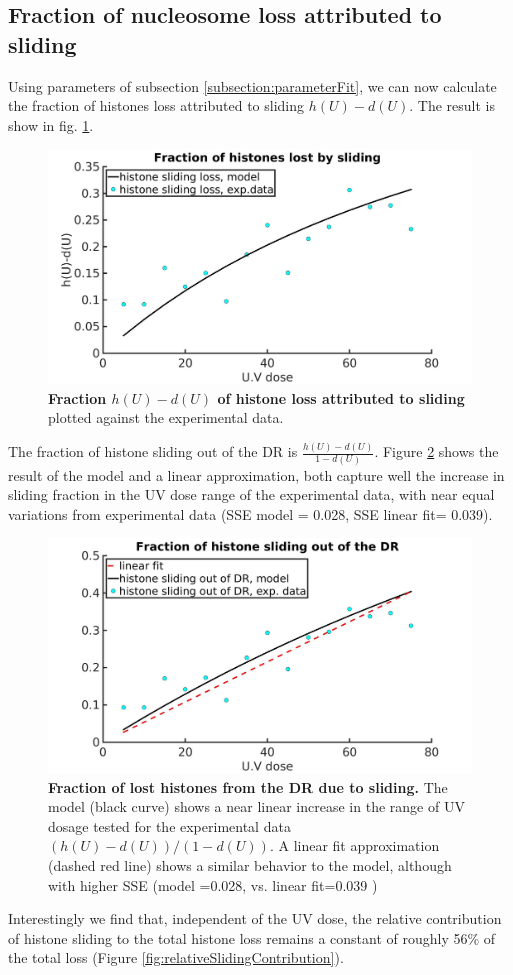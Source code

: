 \documentclass[12pt]{article}
\begin{document}
\subsection{Fraction of nucleosome loss attributed to sliding}\label{subsection:lossAttributedToSliding}
Using parameters of subsection \ref{subsection:parameterFit}, we can now calculate the fraction of histones loss attributed to sliding $h(U)-d(U)$. The result is show in fig. \ref{fig:hVsUVDoseModelFit01}.
\begin{figure}[http!]
\centering
\includegraphics[width=0.5\linewidth, height=0.3\textheight]{hVsUVDoseModelFit01}
\caption{\textbf{Fraction $h(U)-d(U)$ of histone loss attributed to sliding} plotted against the experimental data.}
\label{fig:hVsUVDoseModelFit01}
\end{figure}
The fraction of histone sliding out of the DR is $\frac{h(U)-d(U)}{1-d(U)}$. Figure \ref{fig:histoneSlideFromDamageRegionComparision} shows the result of the model and a linear approximation, both capture well the increase in sliding fraction in the UV dose range of the experimental data, with near equal variations from experimental data (SSE model = 0.028, SSE linear fit= 0.039).
\begin{figure}[http!]
	\centering
	\includegraphics[width=0.7\linewidth, height=0.3\textheight]{histoneSlideFromDamageRegionComparision}
	\caption{\textbf{Fraction of lost histones from the DR due to sliding.} The model (black curve) shows a near linear increase in the range of UV dosage tested for the experimental data $(h(U)-d(U))/(1-d(U))$. A linear fit approximation (dashed red line) shows a similar behavior to the model, although with higher SSE (model =0.028, vs. linear fit=0.039 ) }
	\label{fig:histoneSlideFromDamageRegionComparision}
\end{figure}
Interestingly we find that, independent of the UV dose, the relative contribution of histone sliding to the total histone loss remains a constant of roughly 56\% of the total loss (Figure \ref{fig:relativeSlidingContribution}).
\end{document}
